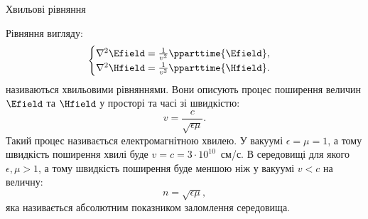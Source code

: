 \documentclass[onlytextwidth]{beamer}
\begin{document}
\begin{frame}{Хвильові рівняння}{}\small
	\begin{block}{}\justifying
		Рівняння вигляду:
		\begin{equation*}
			\begin{cases}
				\nabla^2\Efield = \frac{1}{v^2}\pparttime{\Efield}, \\
				\nabla^2\Hfield = \frac{1}{v^2}\pparttime{\Hfield}.
			\end{cases}
		\end{equation*}
		називаються хвильовими рівняннями. Вони описують процес поширення величин $\Efield$ та $\Hfield$ у просторі та часі зі швидкістю:
		\begin{equation*}
			v= \frac{c}{\sqrt{\epsilon\mu}}.
		\end{equation*}
		Такий процес називається \alert{електромагнітною хвилею}.
		У вакуумі $\epsilon=\mu=1$, а тому швидкість поширення хвилі буде $v = c =3\cdot10^{10}$~см/с. В середовищі для якого $\epsilon, \mu > 1$, а тому
		швидкість поширення буде меншою ніж у вакуумі $v < c$ на величну:
		\begin{equation*}
			n = \sqrt{\epsilon\mu},
		\end{equation*}
		яка називається \alert{абсолютним показником заломлення середовища}.
	\end{block}
\end{frame}
\end{document}
